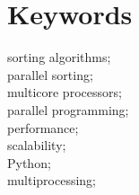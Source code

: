 \cleardoublepage
\chapter*{Keywords}

sorting algorithms;\\
parallel sorting;\\
multicore processors;\\
parallel programming;\\
performance;\\
scalability;\\
Python;\\
multiprocessing;\\
